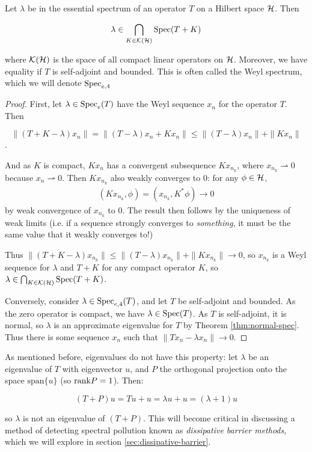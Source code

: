 \documentclass[../main.tex]{subfiles}
\begin{document}
\begin{theorem}
\label{thm:ess-spec-comp-ptb}
  Let $\lambda$ be in the essential spectrum of an operator $T$ on a Hilbert space
  $\mathcal{H}$. Then

  \begin{equation}
  \label{eqn:weyl_spectrum}
    \lambda \in \bigcap_{K \in \mathcal{K}(\mathcal{H})} \mathrm{Spec}(T + K)
  \end{equation}

  where $\mathcal{K}(\mathcal{H})$ is the space of all compact linear operators on $\mathcal{H}$.
  Moreover, we have equality if $T$ is self-adjoint and bounded.
  This is often called the Weyl spectrum, which we will denote $\mathrm{Spec}_{e,4}$
\end{theorem}
\begin{proof}
First, let $\lambda \in \mathrm{Spec}_e(T)$ have the Weyl sequence $x_n$ for the operator $T$. Then 

$$\|(T+K-\lambda)x_n\| = \|(T - \lambda)x_n+Kx_n\| \leq \|(T - \lambda)x_n\| + \|Kx_n\|$$. 

And as $K$ is compact, $Kx_n$ has a convergent subsequence $Kx_{n_k}$, where
$x_{n_k} \rightharpoonup 0$ because $x_n \rightharpoonup 0$. Then
$Kx_{n_k}$ also weakly converges to 0: for any $\phi \in \mathcal{H}$,
\begin{align*}
(Kx_{n_k}, \phi) = (x_{n_k}, K^* \phi) \rightarrow 0
\end{align*}
by weak convergence of $x_{n_k}$ to 0. The result then follows by the uniqueness
of weak limits (i.e. if a sequence strongly converges to
\emph{something}, it must be the same value that it weakly converges to!)

Thus $\|(T+K-\lambda)x_{n_k}\| \leq \|(T - \lambda)x_{n_k}\| + \|Kx_{n_k}\|
\rightarrow 0$, so $x_{n_k}$ is a Weyl sequence for $\lambda$ and $T+K$
for any compact operator $K$, so $\lambda \in \bigcap_{K \in
\mathcal{K}(\mathcal{H})} \mathrm{Spec}(T + K)$.

  Conversely, consider $\lambda \in \mathrm{Spec}_{e,4}(T)$, and let $T$ be self-adjoint and bounded.
  As the zero operator is compact, we have $\lambda \in \mathrm{Spec}(T)$. As $T$ is self-adjoint,
  it is normal, so $\lambda$ is an approximate eigenvalue for $T$ by Theorem \ref{thm:normal-spec}.
  Thus there is some sequence $x_n$ such that $\|Tx_n - \lambda x_n\| \rightarrow 0$. 
\end{proof}

\begin{remark}
As mentioned before, eigenvalues do not have this property: let $\lambda$ be an
eigenvalue of $T$ with eigenvector $u$, and $P$ the orthogonal
projection onto the space $\mathrm{span}\{u\}$ (so $\mathrm{rank} P = 1$). Then:

$$(T+P) u = Tu + u = \lambda u + u = (\lambda + 1)u$$

so $\lambda$ is not an eigenvalue of $(T+P)$. This will become critical in
discussing a method of detecting spectral pollution known as
\emph{dissipative barrier methods}, which we will explore in section
\ref{sec:dissipative-barrier}.
\end{remark}
\end{document}
